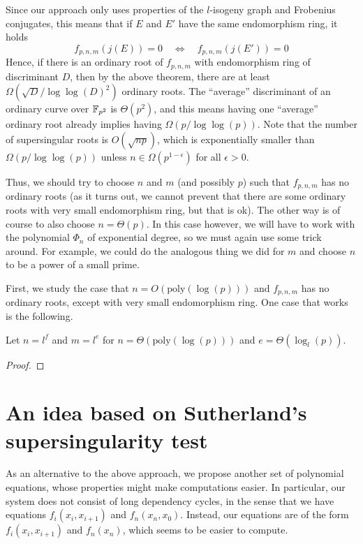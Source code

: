 Since our approach only uses properties of the $l$-isogeny graph and Frobenius conjugates, this means that if $E$ and $E'$ have the same endomorphism ring, it holds
\begin{equation*}
    f_{p, n, m}(j(E)) = 0 \quad \Leftrightarrow \quad f_{p, n, m}(j(E')) = 0
\end{equation*}
Hence, if there is an ordinary root of $f_{p, n, m}$ with endomorphism ring of discriminant $D$, then by the above theorem, there are at least $\Omega(\sqrt{D}/\log\log(D)^2)$ ordinary roots.
The ``average'' discriminant of an ordinary curve over $\mathbb{F}_{p^2}$ is $\Theta(p^2)$, and this means having one ``average'' ordinary root already implies having $\Omega(p / \log\log(p))$.
Note that the number of supersingular roots is $O(\sqrt{np})$, which is exponentially smaller than $\Omega(p/\log\log(p))$ unless $n \in \Omega(p^{1 - \epsilon})$ for all $\epsilon > 0$.

Thus, we should try to choose $n$ and $m$ (and possibly $p$) such that $f_{p, n, m}$ has no ordinary roots
(as it turns out, we cannot prevent that there are some ordinary roots with very small endomorphism ring, but that is ok).
The other way is of course to also choose $n = \Theta(p)$.
In this case however, we will have to work with the polynomial $\Phi_n$ of exponential degree, so we must again use some trick around.
For example, we could do the analogous thing we did for $m$ and choose $n$ to be a power of a small prime.

First, we study the case that $n = O(\mathrm{poly}(\log(p)))$ and $f_{p, n, m}$ has no ordinary roots, except with very small endomorphism ring.
One case that works is the following.
\begin{prop}
    Let $n = l^f$ and $m = l^e$ for $n = \Theta(\mathrm{poly}(\log(p)))$ and $e = \Theta(\log_l(p))$.    
\end{prop}
\begin{proof}
    
\end{proof}

\section{An idea based on Sutherland's supersingularity test}
As an alternative to the above approach, we propose another set of polynomial equations, whose properties might make computations easier.
In particular, our system does not consist of long dependency cycles, in the sense that we have equations $f_i(x_i, x_{i + 1})$ and $f_n(x_n, x_0)$.
Instead, our equations are of the form $f_i(x_i, x_{i + 1})$ and $f_n(x_n)$, which seems to be easier to compute.

